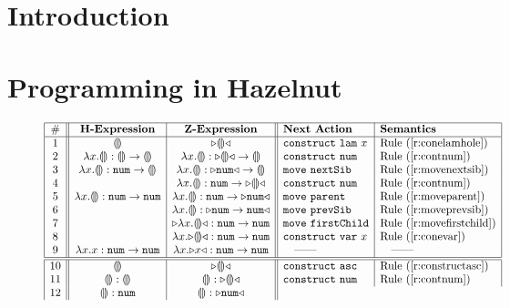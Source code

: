 \documentclass{llncs}
\begin{document}
\section{Introduction}
%


\section{Programming in Hazelnut}
\label{sec:example}
\begin{figure}[t]
\[
\begin{array}{|c||c|c||l|l|}
\hline
\# & \textbf{H-Expression} & \textbf{Z-Expression} & \textbf{Next Action} & \textbf{Semantics}
\\
\hline
1 &
\hhole{} &
\zwsel{\hhole{}}
&
\aConstruct{\flam{x}} & \refrule{\ref{r:conelamhole}}
\\ 2 &
\hlam{x}{\hhole{}} : \tarr{\hhole{}}{\hhole{}} &
\hlam{x}{\hhole{}} : \tarr{\zwsel{\hhole{}}}{\hhole{}}
&
\aConstruct{\fnum{}} & \refrule{\ref{r:contnum}}
\\ 3 &
\hlam{x}{\hhole{}} : \tarr{\tnum{}}{\hhole{}} &
\hlam{x}{\hhole{}} : \tarr{\zwsel{\tnum{}}}{\hhole{}}
&
\aMove{\dNext{}} & \refrule{\ref{r:movenextsib}}
\\ 4 &
&
\hlam{x}{\hhole{}} : \tarr{\tnum}{\zwsel{\hhole{}}}
&
\aConstruct{\fnum{}} & \refrule{\ref{r:contnum}}
\\ 5 &
\hlam{x}{\hhole{}} : \tarr{\tnum{}}{\tnum{}} &
\hlam{x}{\hhole{}} : \tarr{\tnum{}}{\zwsel{\tnum{}}}
&
\aMove{\dParent{}} & \refrule{\ref{r:moveparent}}
\\ 6 &
&
\hlam{x}{\hhole{}} : \zwsel{\tarr{\tnum{}}{\tnum{}}}
&
\aMove{\dPrev{}} & \refrule{\ref{r:moveprevsib}}
\\ 7 &
&
\zwsel{\hlam{x}{\hhole{}}} : \tarr{\tnum{}}{\tnum{}}
&
\aMove{\dChild{}} & \refrule{\ref{r:movefirstchild}}
\\ 8 &
&
\hlam{x}{\zwsel{\hhole{}}} : \tarr{\tnum{}}{\tnum{}}
&
\aConstruct{\fvar{x}} & \refrule{\ref{r:conevar}}
\\ 9 &
\hlam{x}{{x}} : \tarr{\tnum{}}{\tnum{}}
&
\hlam{x}{\zwsel{{x}}} : \tarr{\tnum{}}{\tnum{}}
&
\quad\textrm{---{}---}
&
\quad\textrm{---{}---}
\\
\hline
\hline
10 &
\hhole{} &
\zwsel{\hhole{}}
&
\aConstruct{\fasc} & \refrule{\ref{r:constructasc}}
\\ 
11 &
\hhole{} : \hhole{} &
\hhole{} : \zwsel{ \hhole{}}
&
\aConstruct{\fnum{}} & \refrule{\ref{r:contnum}}
\\
12 &
\hhole{} :\tnum{} &
\hhole{} : \zwsel{\tnum{}}

\end{array}\]
\end{figure}
\end{document}
